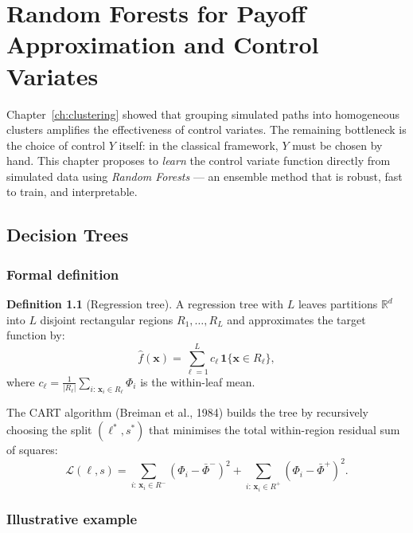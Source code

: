 \documentclass[12pt, a4paper]{report}
\theoremstyle{definition}
\newtheorem{definition}{Definition}[chapter]
\newcommand{\R}{\mathbb{R}}
\begin{document}
\chapter{Random Forests for Payoff Approximation and Control Variates}
\label{ch:random-forests}

Chapter~\ref{ch:clustering} showed that grouping simulated paths into
homogeneous clusters amplifies the effectiveness of control variates.
The remaining bottleneck is the choice of control $Y$ itself: in the
classical framework, $Y$ must be chosen by hand.  This chapter proposes
to \emph{learn} the control variate function directly from simulated
data using \emph{Random Forests} --- an ensemble method that is robust,
fast to train, and interpretable.

\section{Decision Trees}
\label{sec:decision-trees}

\subsection{Formal definition}

\begin{definition}[Regression tree]
A regression tree with $L$ leaves partitions $\R^d$ into $L$ disjoint
rectangular regions $R_1, \ldots, R_L$ and approximates the target
function by:
\begin{equation}
    \hat{f}(\mathbf{x}) = \sum_{\ell=1}^{L} c_\ell\,
    \mathbf{1}\{\mathbf{x} \in R_\ell\},
    \label{eq:tree}
\end{equation}
where $c_\ell = \frac{1}{|R_\ell|}\sum_{i:\,\mathbf{x}_i \in R_\ell}
\Phi_i$ is the within-leaf mean.
\end{definition}

The CART algorithm (Breiman et al., 1984) builds the tree by
recursively choosing the split $(\ell^*, s^*)$ that minimises the total
within-region residual sum of squares:
\begin{equation}
    \mathcal{L}(\ell, s) =
    \sum_{i:\,\mathbf{x}_i \in R^-} (\Phi_i - \bar{\Phi}^-)^2
    + \sum_{i:\,\mathbf{x}_i \in R^+} (\Phi_i - \bar{\Phi}^+)^2.
    \label{eq:cart-criterion}
\end{equation}

\subsection{Illustrative example}
\end{document}
